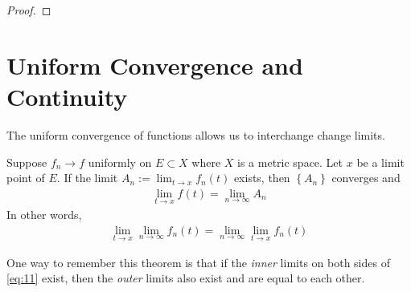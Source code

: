 \documentclass[thmcnt=section, 12pt]{elegantbook}
\begin{document}
\begin{proof}
\end{proof}


\section{Uniform Convergence and Continuity}


\par The uniform convergence of functions allows us to interchange change limits.

\begin{theorem} \label{thm:7}
    Suppose $f_n \to f$ uniformly on $E \subset X$ where $X$ is a metric space. Let $x$ be a limit point of $E$. If the limit $A_n := \lim_{t \to x} f_n(t)$ exists, then $\left\{A_n\right\}$ converges and
    \begin{align*}
        \lim_{t \to x} f(t) = \lim_{n \to \infty} A_n
    \end{align*}
    In other words, 
    \begin{align}
        \lim_{t \to x} \lim_{n \to \infty} f_n(t)
        = \lim_{n \to \infty} \lim_{t \to x} f_n(t)
        \label{eq:11}
    \end{align}
\end{theorem}

\begin{remark}
    One way to remember this theorem is that if the \textit{inner} limits on both sides of \eqref{eq:11} exist, then the \textit{outer} limits also exist and are equal to each other.
\end{remark}
\end{document}
